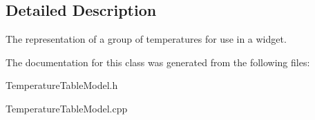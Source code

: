 \subsection{Detailed Description}
The representation of a group of temperatures for use in a widget. 

The documentation for this class was generated from the following files\+:\begin{DoxyCompactItemize}
\item 
Temperature\+Table\+Model.\+h\item 
Temperature\+Table\+Model.\+cpp\end{DoxyCompactItemize}
